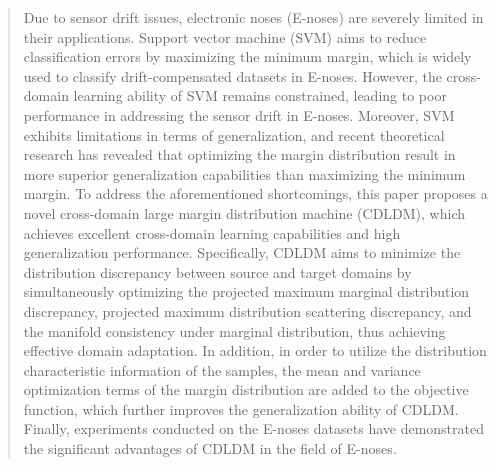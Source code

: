 \documentclass[a4paper]{cas-sc}
\begin{document}
\begin{abstract}
Due to sensor drift issues, electronic noses (E-noses) are severely limited in their applications. Support vector machine (SVM) aims to reduce classification errors by maximizing the minimum margin, which is widely used to classify drift-compensated datasets in E-noses. 
However, the cross-domain learning ability of SVM remains constrained, leading to poor performance in addressing the sensor drift in E-noses.
Moreover, SVM exhibits limitations in terms of generalization, and recent theoretical research has revealed that optimizing the margin distribution result in more superior generalization capabilities than maximizing the minimum margin.
To address the aforementioned shortcomings, this paper proposes a novel cross-domain large margin distribution machine (CDLDM), which achieves excellent cross-domain learning capabilities and high generalization performance.
Specifically, CDLDM aims to minimize the distribution discrepancy between source and target domains by simultaneously optimizing the projected maximum marginal distribution discrepancy, projected maximum distribution scattering discrepancy, and the manifold consistency under marginal distribution, thus achieving effective domain adaptation.
% 
In addition, in order to utilize the distribution characteristic information of the samples, the mean and variance optimization terms of the margin distribution are added to the objective function, which further improves the generalization ability of CDLDM.
Finally, experiments conducted on the E-noses datasets have demonstrated the significant advantages of CDLDM in the field of E-noses. 
\end{abstract}
\end{document}
